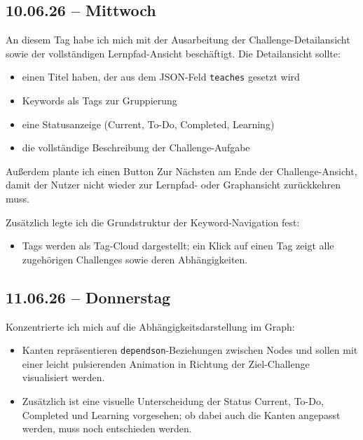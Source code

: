 {\subsection{10.06.26 -- Mittwoch}

An diesem Tag habe ich mich mit der Ausarbeitung der Challenge-Detailansicht sowie
der vollständigen Lernpfad-Ansicht beschäftigt. Die Detailansicht sollte:

\begin{itemize}
  \item einen Titel haben, der aus dem JSON-Feld \texttt{teaches} gesetzt wird
  \item Keywords als Tags zur Gruppierung
  \item eine Statusanzeige (Current, To-Do, Completed, Learning)
  \item die vollständige Beschreibung der Challenge-Aufgabe
\end{itemize}

Außerdem plante ich einen Button \glqq Zur Nächsten\grqq{} am Ende der Challenge-Ansicht,
damit der Nutzer nicht wieder zur Lernpfad- oder Graphansicht zurückkehren muss.

Zusätzlich legte ich die Grundstruktur der Keyword-Navigation fest:

\begin{itemize}
  \item Tags werden als Tag-Cloud dargestellt; ein Klick auf einen Tag zeigt alle
        zugehörigen Challenges sowie deren Abhängigkeiten.
\end{itemize}

\subsection{11.06.26 -- Donnerstag}

Konzentrierte ich mich auf die Abhängigkeitsdarstellung im Graph:

\begin{itemize}
  \item Kanten repräsentieren \texttt{dependson}-Beziehungen zwischen Nodes und
        sollen mit einer leicht pulsierenden Animation in Richtung der Ziel-Challenge
        visualisiert werden.
  \item Zusätzlich ist eine visuelle Unterscheidung der Status Current, To-Do,
        Completed und Learning vorgesehen; ob dabei auch die Kanten angepasst
        werden, muss noch entschieden werden.
\end{itemize}

}

